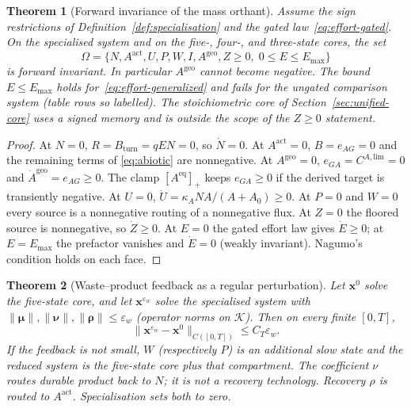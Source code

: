 \documentclass[11pt]{article}
\newtheorem{theorem}{Theorem}
\theoremstyle{definition}
\begin{document}
\begin{theorem}[Forward invariance of the mass orthant]
\label{thm:nonneg}
Assume the sign restrictions of Definition~\ref{def:specialisation} and the gated law~\eqref{eq:effort-gated}. On the specialised system and on the five-, four-, and three-state cores, the set
\[
\Omega=\bigl\{N,A^{\mathrm{act}},U,P,W,I,A^{\mathrm{geo}},Z\ge 0,\; 0\le E\le E_{\max}\bigr\}
\]
is forward invariant. In particular $A^{\mathrm{geo}}$ cannot become negative. The bound $E\le E_{\max}$ holds for~\eqref{eq:effort-generalized} and fails for the ungated comparison system (table rows so labelled). The stoichiometric core of Section~\ref{sec:unified-core} uses a signed memory and is outside the scope of the $Z\ge 0$ statement.
\end{theorem}

\begin{proof}
At $N=0$, $R=B_{\mathrm{turn}}=qEN=0$, so $\dot N=0$. At $A^{\mathrm{act}}=0$, $B=e_{AG}=0$ and the remaining terms of \eqref{eq:abiotic} are nonnegative. At $A^{\mathrm{geo}}=0$, $e_{GA}=C^{A,\mathrm{lim}}=0$ and $\dot A^{\mathrm{geo}}=e_{AG}\ge 0$. The clamp $[A^{\mathrm{eq}}]_+$ keeps $e_{GA}\ge 0$ if the derived target is transiently negative. At $U=0$, $\dot U=\kappa_A N A/(A+A_0)\ge 0$. At $P=0$ and $W=0$ every source is a nonnegative routing of a nonnegative flux. At $Z=0$ the floored source is nonnegative, so $\dot Z\ge 0$. At $E=0$ the gated effort law gives $\dot E\ge 0$; at $E=E_{\max}$ the prefactor vanishes and $\dot E=0$ (weakly invariant). Nagumo's condition holds on each face.
\end{proof}

\begin{theorem}[Waste--product feedback as a regular perturbation]
\label{thm:waste}
Let $\mathbf x^0$ solve the five-state core, and let $\mathbf x^{\varepsilon_w}$ solve the specialised system with $\|\boldsymbol\mu\|,\|\boldsymbol\nu\|,\|\boldsymbol\rho\|\le\varepsilon_w$ (operator norms on $\mathcal K$). Then on every finite $[0,T]$,
\[
\|\mathbf x^{\varepsilon_w}-\mathbf x^0\|_{C([0,T])}\le C_T\varepsilon_w.
\]
If the feedback is not small, $W$ (respectively $P$) is an additional slow state and the reduced system is the five-state core plus that compartment. The coefficient $\nu$ routes durable product back to $N$; it is not a recovery technology. Recovery $\rho$ is routed to $A^{\mathrm{act}}$. Specialisation sets both to zero.
\end{theorem}
\end{document}
